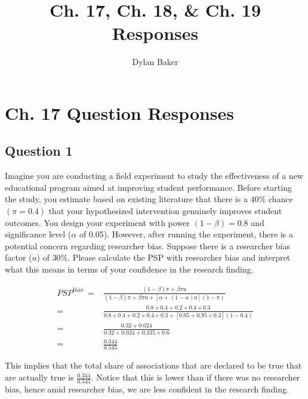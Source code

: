 \documentclass[10pt]{article}
\title{Ch. 17, Ch. 18, \& Ch. 19 Responses}
\author{Dylan Baker}
\begin{document}
\maketitle

\tableofcontents

\section{Ch. 17 Question Responses}

\subsection{Question 1}

Imagine you are conducting a field experiment to study 
the effectiveness of a new educational program 
aimed at improving student performance. 
Before starting the study, you estimate based on 
existing literature that there is a $40 \%$ 
chance $(\pi=0.4)$ that your hypothesized 
intervention genuinely improves student 
outcomes. You design your experiment with 
power $( 1 -\beta) =0.8$ and significance 
level ($\alpha$ of 0.05). However, 
after running the experiment, there is 
a potential concern regarding researcher bias. 
Suppose there is a researcher bias factor ($u$) 
of $30\%$. Please calculate 
the PSP with researcher bias and interpret 
what this means in terms of your confidence in the research finding.

\hrulefill\hspace{0.5em}\dotfill\hspace{0.5em}\hrulefill

\begin{align}
    P S P^{\text {bias }}=&\frac{(1-\beta) \pi+\beta \pi \mathrm{u}}{(1-\beta) \pi+\beta \pi \mathrm{u}+[\alpha+(1-\alpha) \mathrm{u}](1-\pi)} \\
    = & \frac{0.8 \times 0.4+0.2 \times 0.4 \times 0.3}{0.8 \times 0.4+0.2 \times 0.4 \times 0.3+[0.05+0.95 \times 0.3](1-0.4)} \\
    = & \frac{0.32+0.024}{0.32+0.024+0.335 \times 0.6} \\
    = & \frac{0.344}{0.545}
\end{align}

This implies that the total share of associations that 
are declared to be true that are actually true is $\frac{0.344}{0.545}$. 
Notice that this is lower than if there was no researcher bias,
hence amid researcher bias, we are less confident in the 
research finding.
\end{document}
